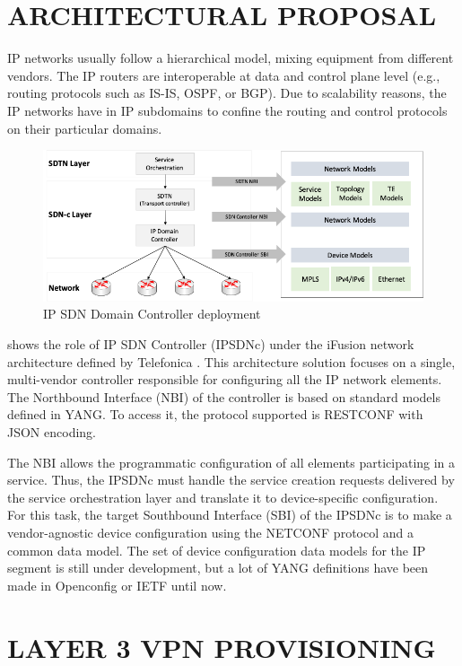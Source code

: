\documentclass[conference]{IEEEtran}
\begin{document}
\section{ARCHITECTURAL PROPOSAL}
\label{sect:arqu}

IP networks usually follow a hierarchical model, mixing equipment from different vendors. The IP routers are interoperable at data and control plane level (e.g., routing protocols such as IS-IS, OSPF, or BGP). Due to scalability reasons, the IP networks have in IP subdomains to confine the routing and control protocols on their particular domains.

\begin{figure}
	\centering
		\includegraphics[width=\linewidth]{fig1_architecture.png}
	\caption{IP SDN Domain Controller deployment}
	\label{FIG:1}
\end{figure}


 shows the role of IP SDN Controller (IPSDNc) under the iFusion network architecture defined by Telefonica \cite{contreras2019ifusion}. This architecture solution focuses on a single, multi-vendor controller responsible for configuring all the IP network elements. The Northbound Interface (NBI) of the controller is based on standard models defined in YANG. To access it, the protocol supported is RESTCONF with JSON encoding.

The NBI allows the programmatic configuration of all elements participating in a service. Thus, the IPSDNc must handle the service creation requests delivered by the service orchestration layer and translate it to device-specific configuration. For this task, the target Southbound Interface (SBI) of the IPSDNc is to make a vendor-agnostic device configuration using the NETCONF protocol and a common data model. The set of device configuration data models for the IP segment is still under development, but a lot of YANG definitions have been made in Openconfig or IETF until now. 

\section{LAYER 3 VPN PROVISIONING}
\label{sect:l3vpn}
\end{document}
